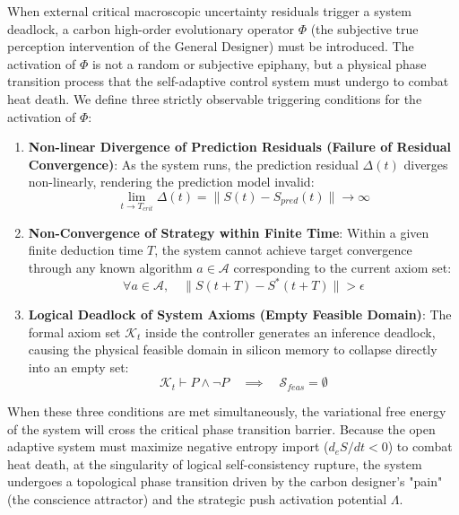 \documentclass[11pt,a4paper]{article}
\begin{document}
When external critical macroscopic uncertainty residuals trigger a system deadlock, a carbon high-order evolutionary operator $\Phi$ (the subjective true perception intervention of the General Designer) must be introduced. The activation of $\Phi$ is not a random or subjective epiphany, but a physical phase transition process that the self-adaptive control system must undergo to combat heat death. We define three strictly observable triggering conditions for the activation of $\Phi$:
\begin{enumerate}
    \item \textbf{Non-linear Divergence of Prediction Residuals (Failure of Residual Convergence)}:
    As the system runs, the prediction residual $\Delta(t)$ diverges non-linearly, rendering the prediction model invalid:
    \begin{equation}
        \lim_{t \to T_{crit}} \Delta(t) = \|S(t) - S_{pred}(t)\| \to \infty
    \end{equation}
    \item \textbf{Non-Convergence of Strategy within Finite Time}:
    Within a given finite deduction time $T$, the system cannot achieve target convergence through any known algorithm $a \in \mathcal{A}$ corresponding to the current axiom set:
    \begin{equation}
        \forall a \in \mathcal{A}, \quad \|S(t+T) - S^*(t+T)\| > \epsilon
    \end{equation}
    \item \textbf{Logical Deadlock of System Axioms (Empty Feasible Domain)}:
    The formal axiom set $\mathcal{K}_t$ inside the controller generates an inference deadlock, causing the physical feasible domain in silicon memory to collapse directly into an empty set:
    \begin{equation}
        \mathcal{K}_t \vdash P \wedge \neg P \quad \implies \quad \mathcal{S}_{feas} = \emptyset
    \end{equation}
\end{enumerate}

When these three conditions are met simultaneously, the variational free energy of the system will cross the critical phase transition barrier. Because the open adaptive system must maximize negative entropy import ($d_eS/dt < 0$) to combat heat death, at the singularity of logical self-consistency rupture, the system undergoes a topological phase transition driven by the carbon designer's "pain" (the conscience attractor) and the strategic push activation potential $\Lambda$.
\end{document}
